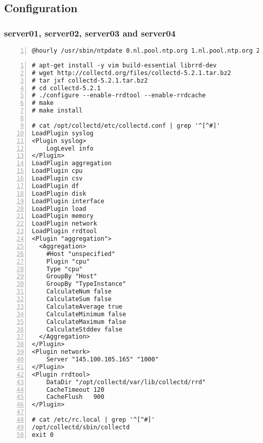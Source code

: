 \documentclass[Configuration]{subfiles}
\begin{document}
\newpage
\subsection{Configuration}
\label{sec:Configuration}

\subsubsection{server01, server02, server03 and server04}
\begin{lstlisting}[frame=single,caption=cronjob -l ,backgroundcolor=\color{gray},breaklines=true,numbers=left]
@hourly /usr/sbin/ntpdate 0.nl.pool.ntp.org 1.nl.pool.ntp.org 2.nl.pool.ntp.org 3.nl.pool.ntp.org
\end{lstlisting}


\begin{lstlisting}[frame=single,caption=Collectd,backgroundcolor=\color{gray},breaklines=true,numbers=left,]
# apt-get install -y vim build-essential librrd-dev
# wget http://collectd.org/files/collectd-5.2.1.tar.bz2
# tar jxf collectd-5.2.1.tar.bz2
# cd collectd-5.2.1
# ./configure --enable-rrdtool --enable-rrdcache
# make 
# make install 

# cat /opt/collectd/etc/collectd.conf | grep '^[^#]'
LoadPlugin syslog
<Plugin syslog>
    LogLevel info
</Plugin>
LoadPlugin aggregation
LoadPlugin cpu
LoadPlugin csv
LoadPlugin df
LoadPlugin disk
LoadPlugin interface
LoadPlugin load
LoadPlugin memory
LoadPlugin network
LoadPlugin rrdtool
<Plugin "aggregation">
  <Aggregation>
    #Host "unspecified"
    Plugin "cpu"
    Type "cpu"
    GroupBy "Host"
    GroupBy "TypeInstance"
    CalculateNum false
    CalculateSum false
    CalculateAverage true
    CalculateMinimum false
    CalculateMaximum false
    CalculateStddev false
  </Aggregation>
</Plugin>
<Plugin network>
    Server "145.100.105.165" "1000"
</Plugin> 
<Plugin rrdtool>
    DataDir "/opt/collectd/var/lib/collectd/rrd"
    CacheTimeout 120
    CacheFlush   900
</Plugin>

# cat /etc/rc.local | grep '^[^#]'
/opt/collectd/sbin/collectd
exit 0
\end{lstlisting}
\end{document}

